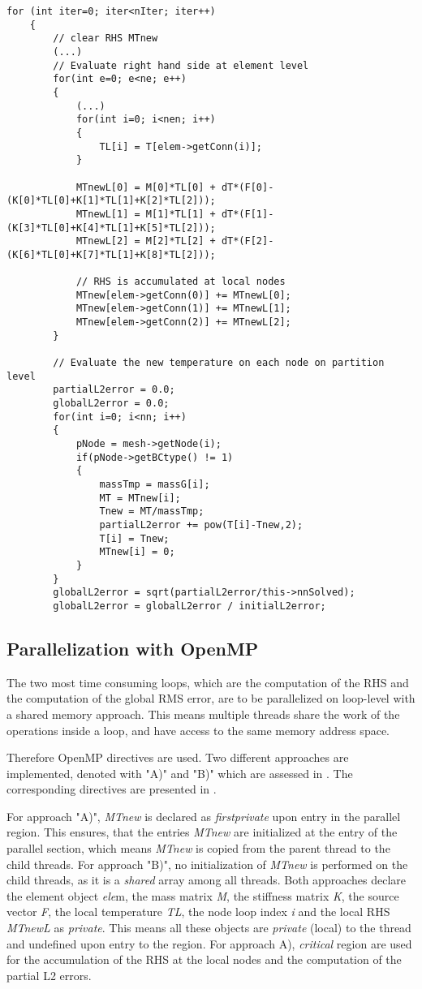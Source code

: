 \begin{lstlisting}[caption={\label{Code:Serial2} Explicit Solver}]
	for (int iter=0; iter<nIter; iter++)
	{
		// clear RHS MTnew
		(...)
		// Evaluate right hand side at element level
		for(int e=0; e<ne; e++)
		{
			(...)
			for(int i=0; i<nen; i++)
			{
				TL[i] = T[elem->getConn(i)];
			}
			
			MTnewL[0] = M[0]*TL[0] + dT*(F[0]-(K[0]*TL[0]+K[1]*TL[1]+K[2]*TL[2]));
			MTnewL[1] = M[1]*TL[1] + dT*(F[1]-(K[3]*TL[0]+K[4]*TL[1]+K[5]*TL[2]));
			MTnewL[2] = M[2]*TL[2] + dT*(F[2]-(K[6]*TL[0]+K[7]*TL[1]+K[8]*TL[2]));
			
			// RHS is accumulated at local nodes
			MTnew[elem->getConn(0)] += MTnewL[0];
			MTnew[elem->getConn(1)] += MTnewL[1];
			MTnew[elem->getConn(2)] += MTnewL[2];
		}
		
		// Evaluate the new temperature on each node on partition level
		partialL2error = 0.0;
		globalL2error = 0.0;
		for(int i=0; i<nn; i++)
		{
			pNode = mesh->getNode(i);
			if(pNode->getBCtype() != 1)
			{
				massTmp = massG[i];
				MT = MTnew[i];
				Tnew = MT/massTmp;
				partialL2error += pow(T[i]-Tnew,2);
				T[i] = Tnew;
				MTnew[i] = 0;
			}
		}
		globalL2error = sqrt(partialL2error/this->nnSolved);
		globalL2error = globalL2error / initialL2error;
\end{lstlisting}

\subsection{Parallelization with OpenMP \label{sec:POpenMP}}

The two most time consuming loops, which are the computation of the RHS and the computation of the global RMS error, are to be parallelized on loop-level with a shared memory approach. This means multiple threads share the work of the operations inside a loop, and have access to the same memory address space.

Therefore OpenMP directives are used. Two different approaches are implemented, denoted with "A)" and "B)" which are assessed in . The corresponding directives are presented in .

For approach "A)", \textit{MTnew} is declared as \textit{firstprivate} upon entry in the parallel region. This ensures, that the entries \textit{MTnew} are initialized at the entry of the parallel section, which means \textit{MTnew} is copied from the parent thread to the child threads. For approach "B)", no initialization of \textit{MTnew} is performed on the child threads, as it is a \textit{shared} array among all threads. Both approaches declare the element object \textit{ele}m, the mass matrix \textit{M}, the stiffness matrix \textit{K}, the source vector \textit{F}, the local temperature \textit{TL}, the node loop index \textit{i} and the local RHS \textit{MTnewL} as \textit{private}. This means all these objects are \textit{private} (local) to the thread and undefined upon entry to the region. For approach A), \textit{critical} region are used for the accumulation of the RHS at the local nodes and the computation of the partial L2 errors. 

